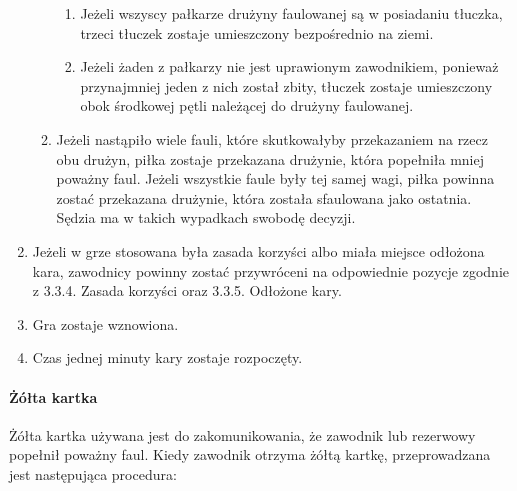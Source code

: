 \documentclass[12pt]{article}
\begin{document}
\begin{enumerate}
\begin{enumerate}
		            \begin{enumerate}
			            \item
			                  Jeżeli wszyscy pałkarze drużyny faulowanej są w posiadaniu
			                  tłuczka, trzeci tłuczek zostaje umieszczony bezpośrednio na ziemi.
			            \item
			                  Jeżeli żaden z pałkarzy nie jest uprawionym zawodnikiem, ponieważ
			                  przynajmniej jeden z nich został zbity, tłuczek zostaje
			                  umieszczony obok środkowej pętli należącej do drużyny faulowanej.
		            \end{enumerate}
		      \item
		            Jeżeli nastąpiło wiele fauli, które skutkowałyby przekazaniem na
		            rzecz obu drużyn, piłka zostaje przekazana drużynie, która popełniła
		            mniej poważny faul. Jeżeli wszystkie faule były tej samej wagi,
		            piłka powinna zostać przekazana drużynie, która została sfaulowana
		            jako ostatnia. Sędzia ma w takich wypadkach swobodę decyzji.
	      \end{enumerate}
	\item
	      Jeżeli w grze stosowana była zasada korzyści albo miała miejsce
	      odłożona kara, zawodnicy powinny zostać przywróceni na odpowiednie
	      pozycje zgodnie z 3.3.4. Zasada korzyści oraz 3.3.5. Odłożone kary.
	\item
	      Gra zostaje wznowiona.
	\item
	      Czas jednej minuty kary zostaje rozpoczęty.
\end{enumerate}

\paragraph{Żółta kartka}
Żółta kartka używana jest do
zakomunikowania, że zawodnik lub rezerwowy popełnił poważny faul. Kiedy
zawodnik otrzyma żółtą kartkę, przeprowadzana jest następująca
procedura:
\end{document}
